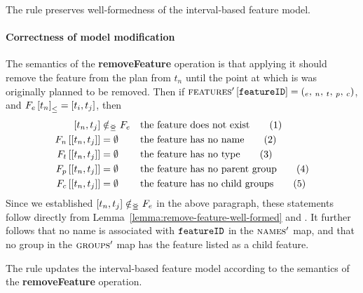 \begin{lemma}
   The  rule preserves well-formedness of the interval-based feature model. 
   \label{lemma:remove-feature-well-formed}
\end{lemma}

\paragraph{Correctness of model modification}
The semantics of the \textbf{removeFeature} operation is that applying it should remove the feature from the plan from $t_n$ until the point at which is was originally planned to be removed. Then if $\textsc{features}' \left[ \texttt{featureID} \right] = \left(_e,\, _n,\, _t,\, _p,\, _c\right)$, and $\containing{F_e}{t_n} = \interval{t_i}{t_j}$, then
\begin{align}
   \interval{t_n}{t_j} &\notinnr F_e && \text{the feature does not exist} \tag{1} \label{remove-feature1}\\
   \lookup{F_n}{\interval{t_n}{t_j}} &= \emptyset && \text{the feature has no name} \tag{2} \label{remove-feature2}\\
   \lookup{F_t}{\interval{t_n}{t_j}} &= \emptyset  && \text{the feature has no type} \tag{3} \label{remove-feature3}\\
   \lookup{F_p}{\interval{t_n}{t_j}} &= \emptyset  && \text{the feature has no parent group} \tag{4} \label{remove-feature4}\\
   \lookup{F_c}{\interval{t_n}{t_j}} &= \emptyset && \text{the feature has no child groups} \tag{5} \label{remove-feature5}
\end{align}
Since we established $\interval{t_n}{t_j} \notinnr F_e$ in the above paragraph, these
statements follow directly from Lemma~\vref{lemma:remove-feature-well-formed} and . It further follows that no name is associated with $\texttt{featureID}$ in the $\textsc{names}{}'$ map, and that no group in the $\textsc{groups}{}{}'$ map has the feature listed as a child feature.
\\

\begin{lemma}
   The  rule updates the interval-based feature model according to the semantics of the \textbf{removeFeature} operation.
   \label{lemma:remove-feature-mod}
\end{lemma}
